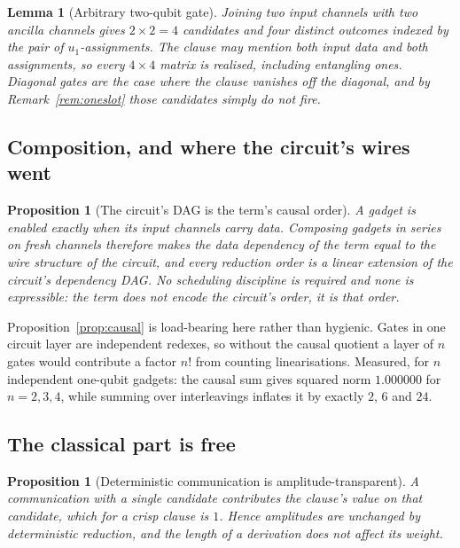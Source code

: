 \documentclass[11pt,a4paper]{article}
\theoremstyle{plain}
\newtheorem{proposition}[theorem]{Proposition}
\newtheorem{lemma}[theorem]{Lemma}
\theoremstyle{definition}
\theoremstyle{remark}
\begin{document}
\begin{lemma}[Arbitrary two-qubit gate]\label{lem:2q}
Joining two input channels with two ancilla channels gives
$2 \times 2 = 4$ candidates and four distinct outcomes indexed by the pair of
$u_1$-assignments. The clause may mention both input data and both assignments,
so every $4 \times 4$ matrix is realised, including entangling ones. Diagonal
gates are the case where the clause vanishes off the diagonal, and by
Remark~\ref{rem:oneslot} those candidates simply do not fire.
\end{lemma}

\subsection{Composition, and where the circuit's wires went}

\begin{proposition}[The circuit's DAG is the term's causal order]\label{prop:dag}
A gadget is enabled exactly when its input channels carry data. Composing
gadgets in series on fresh channels therefore makes the data dependency of the
term equal to the wire structure of the circuit, and every reduction order is a
linear extension of the circuit's dependency DAG. No scheduling discipline is
required and none is expressible: the term does not encode the circuit's order,
it \emph{is} that order.
\end{proposition}

Proposition~\ref{prop:causal} is load-bearing here rather than hygienic. Gates in
one circuit layer are independent redexes, so without the causal quotient a layer
of $n$ gates would contribute a factor $n!$ from counting linearisations.
Measured, for $n$ independent one-qubit gadgets: the causal sum gives squared
norm $1.000000$ for $n = 2,3,4$, while summing over interleavings inflates it by
exactly $2$, $6$ and $24$.

\subsection{The classical part is free}

\begin{proposition}[Deterministic communication is amplitude-transparent]\label{prop:free}
A communication with a single candidate contributes the clause's value on that
candidate, which for a crisp clause is $1$. Hence amplitudes are unchanged by
deterministic reduction, and the \emph{length} of a derivation does not affect
its weight.
\end{proposition}
\end{document}
